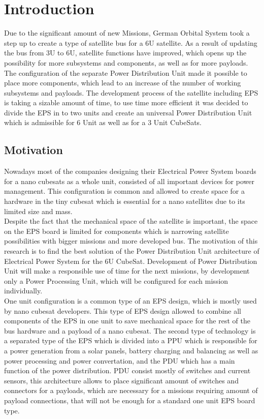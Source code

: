 \chapter{Introduction\label{cha:chapter1}}
Due to the significant amount of new Missions, German Orbital System took a step up to create a type of satellite bus for a 6U satellite.  As a result of updating the bus from 3U to 6U, satellite functions have improved, which opens up the possibility for more subsystems and components, as well as for more payloads. The configuration of the separate Power Distribution Unit made it possible to place more components, which lead to an increase of the number of working subsystems and payloads. The development process of the satellite including EPS is taking a sizable amount of time, to use time more efficient it was decided to divide the EPS in to two units and create an universal Power Distribution Unit which is admissible for 6 Unit as well as for a 3 Unit CubeSats. 
 

\section{Motivation\label{sec:moti}}
Nowadays most of the companies designing their Electrical Power System boards for a nano cubesats as a whole unit, consisted of all important devices for power management. This configuration is common and allowed to create space for a hardware in the tiny cubesat which is essential for a nano satellites due to its limited size and mass. 
\\  Despite the fact that the mechanical space of the satellite is important, the space on the EPS board is limited for components which is narrowing satellite possibilities with bigger missions and more developed bus. 
The motivation of this research is to find the best solution of the Power Distribution Unit architecture of Electrical Power System for the 6U CubeSat. Development of Power Distribution Unit will make a responsible use of time for the next missions, by development only a Power Processing Unit, which will be configured for each mission individually.\\
One unit configuration is a common type of an EPS design, which is mostly used by nano cubesat developers. This type of EPS design allowed to combine all components of the EPS in one unit to save mechanical space for the rest of the bus hardware and a payload of a nano cubesat. The second type of technology is a separated type of the EPS which is divided into a PPU which is responsible for a power generation from a solar panels, battery charging and balancing as well as power processing and power convertation, and the PDU which has a main function of the power distribution. PDU consist mostly of switches and current sensors, this architecture allows to place significant amount of switches and connectors for a payloads, which are necessary for a missions requiring amount of payload connections, that will not be enough for a standard one unit EPS board type. \\


